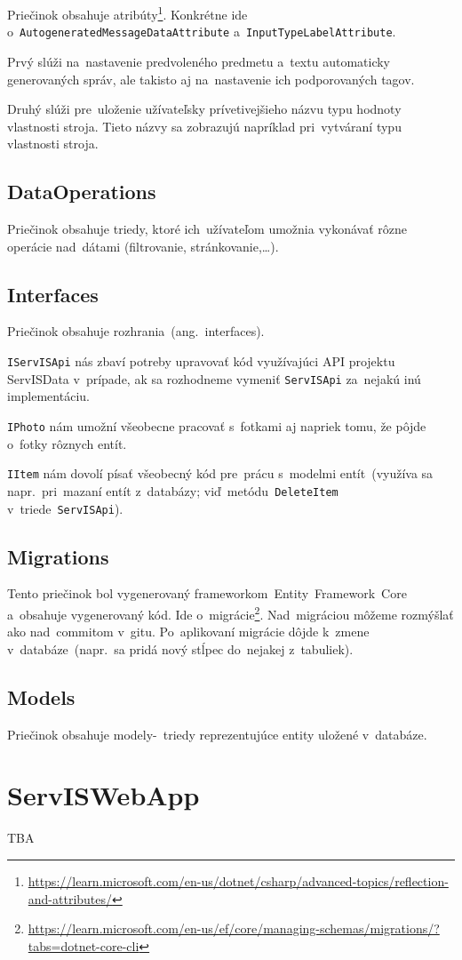 Priečinok obsahuje atribúty\footnote{\url{https://learn.microsoft.com/en-us/dotnet/csharp/advanced-topics/reflection-and-attributes/}}. Konkrétne ide o~\verb|AutogeneratedMessageDataAttribute| a~\verb|InputTypeLabelAttribute|.

Prvý slúži na~nastavenie predvoleného predmetu a~textu automaticky generovaných správ, ale takisto aj na~nastavenie ich podporovaných tagov.

Druhý slúži pre~uloženie užívateľsky prívetivejšieho názvu typu hodnoty vlastnosti stroja. Tieto názvy sa zobrazujú napríklad pri~vytváraní typu vlastnosti stroja.

\subsection{DataOperations}

Priečinok obsahuje triedy, ktoré ich~užívateľom umožnia vykonávať rôzne operácie nad~dátami (filtrovanie, stránkovanie,\dots).

\subsection{Interfaces}

Priečinok obsahuje rozhrania~(ang.~interfaces).

\verb|IServISApi| nás zbaví potreby upravovať kód využívajúci API projektu ServISData v~prípade, ak sa rozhodneme vymeniť \verb|ServISApi| za~nejakú inú implementáciu.

\verb|IPhoto| nám umožní všeobecne pracovať s~fotkami aj napriek tomu, že pôjde o~fotky rôznych entít.

\verb|IItem| nám dovolí písať všeobecný kód pre~prácu s~modelmi entít~(využíva sa napr.~pri~mazaní entít z~databázy; viď~metódu~\verb|DeleteItem| v~triede~\verb|ServISApi|).

\subsection{Migrations}

Tento priečinok bol vygenerovaný frameworkom~Entity~Framework~Core a~obsahuje vygenerovaný kód. Ide o~migrácie\footnote{\url{https://learn.microsoft.com/en-us/ef/core/managing-schemas/migrations/?tabs=dotnet-core-cli}}. Nad~migráciou môžeme rozmýšlať ako nad~commitom v~gitu. Po~aplikovaní migrácie dôjde k~zmene v~databáze~(napr.~sa pridá nový stĺpec do~nejakej z~tabuliek).

\subsection{Models}

Priečinok obsahuje modely-~triedy reprezentujúce entity uložené v~databáze.

\section{ServISWebApp}
TBA
